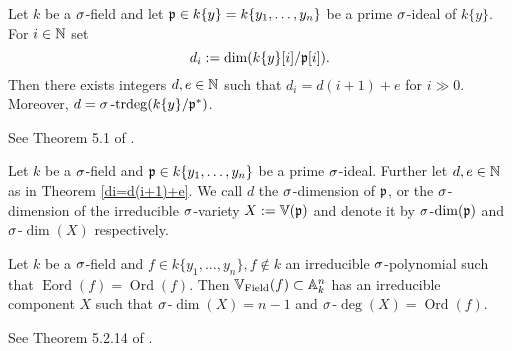 \begin{theorem}\label{di=d(i+1)+e}
Let $k$ be a $\sigma$-field and let $\mathfrak{p} \in k\{y\} = k\{y_1,\ldots,y_n\}$ be a prime $\sigma$-ideal of $k\{y\}$. For $i \in \mathbb{N}$ set $$d_i := \dim(k\{y\}[i]/\mathfrak{p}[i]).$$
Then there exists integers $d, e \in \mathbb{N}$ such that $d_i = d(i+1) + e$ for $i \gg 0$. Moreover, $d = \sigma\operatorname{-trdeg}(k\{y\}/\mathfrak{p}^*)$.
\begin{bew}
See Theorem 5.1 of \cite{wibmer}.
\end{bew}
\end{theorem}

\begin{defn}
Let $k$ be a $\sigma$-field and $\mathfrak{p} \in k\{y_1,\ldots,y_n\}$ be a prime $\sigma$-ideal. Further let $d, e \in \mathbb{N}$ as in Theorem \ref{di=d(i+1)+e}. We call $d$ the $\sigma$-dimension of $\mathfrak{p}$, 
or the $\sigma$-dimension of the irreducible $\sigma$-variety $X:= \mathbb{V}(\mathfrak{p})$ and denote it by $\sigma$-$\dim(\mathfrak{p})$ and $\sigma$-$\dim(X)$ respectively.
\end{defn}

\begin{theorem}\label{irredcomp}
Let $k$ be a $\sigma$-field and $f \in k\{y_1,\ldots,y_n\}, f \notin k$ an irreducible $\sigma$-polynomial such that $\operatorname{Eord}(f) = \operatorname{Ord}(f)$. Then $\mathbb{V}_{\operatorname{Field}}(f) \subset \mathbb{A}_k^n$ has an irreducible component $X$ such that $\sigma$-$\dim(X) = n-1$ and $\sigma$-$\operatorname{deg}(X) = \operatorname{Ord}(f)$.
\begin{bew}
See Theorem 5.2.14 of \cite{wibmer}.
\end{bew}
\end{theorem}

